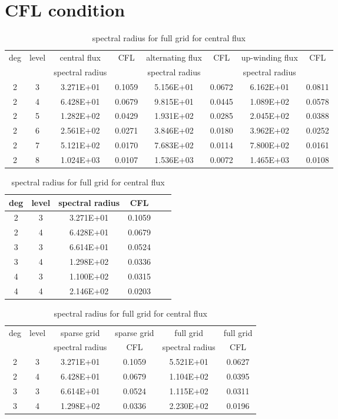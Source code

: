 \documentclass[a4paper]{article}
\begin{document}
\section{CFL condition}
\begin{table}[htbp]
\caption{\label{tab:test}The approximation of bounding CFL }
\centering
\vspace{5pt}
\begin{tabular}{cccccccc}
\toprule
deg &level &central flux &CFL &alternating flux &CFL &up-winding flux &CFL\\
       &        &spectral radius &         &spectral radius       &         &spectral radius        &         \\
\midrule
2 &3 &3.271E+01 &0.1059 &5.156E+01 &0.0672        &6.162E+01& 0.0811       \\
2 &4 &6.428E+01 &0.0679 &9.815E+01 &0.0445         &1.089E+02 &0.0578\\
2 &5 &1.282E+02 &0.0429 &1.931E+02 &0.0285&2.045E+02&0.0388\\
2 &6 &2.561E+02 &0.0271 &3.846E+02 &0.0180&3.962E+02&0.0252\\
2 &7 &5.121E+02 &0.0170 &7.683E+02 &0.0114&7.800E+02&0.0161\\
2 &8 &1.024E+03 &0.0107&1.536E+03 &0.0072&1.465E+03 &0.0108\\ 

\bottomrule
\end{tabular}

\caption{\label{tab:test}spectral radius for different degree for central flux}
\centering
\vspace{5pt}
\begin{tabular}{cccccc}
\toprule
deg &level &spectral radius & CFL\\
\midrule
2&3&3.271E+01&0.1059\\
2&4&6.428E+01&0.0679\\
3&3&6.614E+01&0.0524\\
3&4&1.298E+02&0.0336\\
4&3&1.100E+02&0.0315\\
4&4&2.146E+02&0.0203\\
\bottomrule
\end{tabular}

\caption{\label{tab:test}spectral radius for full grid for central flux}
\centering
\vspace{5pt}
\begin{tabular}{cccccc}
\toprule
deg &level &sparse grid&sparse grid&full grid&full grid\\
       &        &spectral radius&CFL&spectral radius&CFL\\
\midrule
2&3&3.271E+01&0.1059&5.521E+01&0.0627\\
2&4&6.428E+01&0.0679&1.104E+02&0.0395\\
3&3&6.614E+01&0.0524&1.115E+02&0.0311\\
3&4&1.298E+02&0.0336&2.230E+02&0.0196\\

\bottomrule
\end{tabular}

\end{table}
\end{document}
